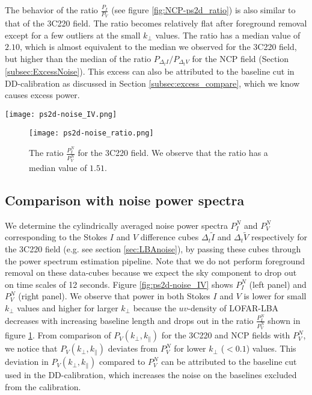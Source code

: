 \documentclass[fleqn,usenatbib]{mnras}
\begin{document}
The behavior of the ratio $\frac{P_{I}}{P_{V}}$ (see figure \ref{fig:NCP-ps2d_ratio}) is also similar to that of the 3C220 field. The ratio becomes relatively flat after foreground removal except for a few outliers at the small $k_{\perp}$ values. The ratio has a median value of $2.10$, which is almost equivalent to the median we observed for the 3C220 field, but higher than the median of the ratio $P_{\Delta_t I} / P_{\Delta_t V}$ for the NCP field (Section \ref{subsec:ExcessNoise}). This excess can also be attributed to the baseline cut in DD-calibration as discussed in Section \ref{subsec:excess_compare}, which we know causes excess power.

\begin{figure*}
\centering
\texttt{[image: ps2d-noise\_IV.png]}
    \caption{The cylindrically averaged noise power spectra $P_{I}^N$ and $P_{V}^N$ (corresponding to Stokes $I$ and $V$) for the 3C220 field determined from the difference cubes $\Delta_t\tilde{I}$ and $\Delta_t\tilde{V}$ respectively. The left panel shows $P_{I}^N$ and the right panel shows $P_{V}^N$.} 
\label{fig:ps2d-noise_IV}
\end{figure*} 

\begin{figure}
\centering
\texttt{[image: ps2d-noise\_ratio.png]}
    \caption{The ratio $\frac{P_{I}^N}{P_{V}^N}$ for the 3C220 field. We observe that the ratio has a median value of $1.51$.} 
\label{fig:ps2d-noise_ratio}
\end{figure} 

\subsection{Comparison with noise power spectra}

We determine the cylindrically averaged noise power spectra $P_{I}^N$ and $P_{V}^N$ corresponding to the Stokes $I$ and $V$ difference cubes $\Delta_t \tilde{I}$ and $\Delta_t \tilde{V}$ respectively for the 3C220 field (e.g. see section \ref{sec:LBAnoise}), by passing these cubes through the power spectrum estimation pipeline. Note that we do not perform foreground removal on these data-cubes because we expect the sky component to drop out on time scales of 12 seconds. Figure \ref{fig:ps2d-noise_IV} shows $P_{I}^N$ (left panel) and $P_{V}^N$ (right panel). We observe that power in both Stokes $I$ and $V$ is lower for small $k_{\perp}$ values and higher for larger $k_{\perp}$ because the $uv$-density of LOFAR-LBA decreases with increasing baseline length and drops out in the ratio $\frac{P_{I}^N}{P_{V}^N}$ shown in figure \ref{fig:ps2d-noise_ratio}. From comparison of $P_V(k_{\perp},k_{\parallel})$ for the 3C220 and NCP fields with $P_{V}^N$, we notice that $P_V(k_{\perp},k_{\parallel})$ deviates from $P_{V}^N$ for lower $k_{\perp}$ ($<0.1$) values. This deviation in $P_V(k_{\perp},k_{\parallel})$ compared to $P_{V}^N$ can be attributed to the baseline cut used in the DD-calibration, which increases the noise on the baselines excluded from the calibration. 
\end{document}
